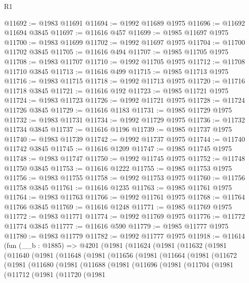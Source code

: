 \begin{lexlean}{R1}
\begin{coremodule}
@11692 := @1983 @11691
@11694 := @1992 @11689 @1975
@11696 := @11692 @11694 @3845
@11697 := @11616 @457
@11699 := @1985 @11697 @1975
@11700 := @1983 @11699
@11702 := @1992 @11697 @1975
@11704 := @11700 @11702 @3845
@11705 := @11616 @494
@11707 := @1985 @11705 @1975
@11708 := @1983 @11707
@11710 := @1992 @11705 @1975
@11712 := @11708 @11710 @3845
@11713 := @11616 @499
@11715 := @1985 @11713 @1975
@11716 := @1983 @11715
@11718 := @1992 @11713 @1975
@11720 := @11716 @11718 @3845
@11721 := @11616 @192
@11723 := @1985 @11721 @1975
@11724 := @1983 @11723
@11726 := @1992 @11721 @1975
@11728 := @11724 @11726 @3845
@11729 := @11616 @1183
@11731 := @1985 @11729 @1975
@11732 := @1983 @11731
@11734 := @1992 @11729 @1975
@11736 := @11732 @11734 @3845
@11737 := @11616 @1196
@11739 := @1985 @11737 @1975
@11740 := @1983 @11739
@11742 := @1992 @11737 @1975
@11744 := @11740 @11742 @3845
@11745 := @11616 @1209
@11747 := @1985 @11745 @1975
@11748 := @1983 @11747
@11750 := @1992 @11745 @1975
@11752 := @11748 @11750 @3845
@11753 := @11616 @1222
@11755 := @1985 @11753 @1975
@11756 := @1983 @11755
@11758 := @1992 @11753 @1975
@11760 := @11756 @11758 @3845
@11761 := @11616 @1235
@11763 := @1985 @11761 @1975
@11764 := @1983 @11763
@11766 := @1992 @11761 @1975
@11768 := @11764 @11766 @3845
@11769 := @11616 @1248
@11771 := @1985 @11769 @1975
@11772 := @1983 @11771
@11774 := @1992 @11769 @1975
@11776 := @11772 @11774 @3845
@11777 := @11616 @590
@11779 := @1985 @11777 @1975
@11780 := @1983 @11779
@11782 := @1992 @11777 @1975
@11918 := @11614
    (fun (__b : @1885) =>
    @4201
      (@1981
        (@11624
          (@1981
            (@11632
              (@1981
                (@11640
                  (@1981
                    (@11648
                      (@1981
                        (@11656
                          (@1981
                            (@11664
                              (@1981
                                (@11672
                                  (@1981
                                    (@11680
                                      (@1981
                                        (@11688
                                          (@1981
                                            (@11696
                                              (@1981
                                                (@11704
                                                  (@1981
                                                    (@11712
                                                      (@1981
                                                        (@11720
                                                          (@1981

\end{coremodule}
\end{lexlean}
